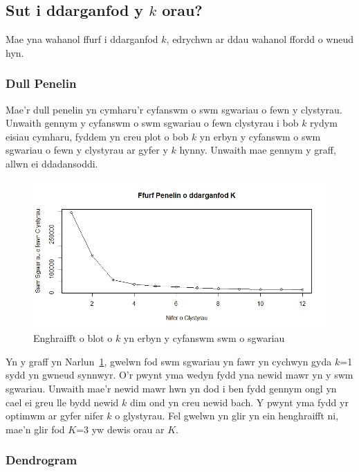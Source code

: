 
\subsection{Sut i ddarganfod y $k$ orau?}

Mae yna wahanol ffurf i ddarganfod $k$, edrychwn ar ddau wahanol ffordd o wneud hyn. 

\subsubsection{Dull Penelin}

Mae'r dull penelin yn cymharu'r cyfanswm o swm sgwariau o fewn y clystyrau. Unwaith gennym y cyfanswm o swm sgwariau o fewn clystyrau i bob $k$ rydym eisiau cymharu, fyddem yn creu plot o bob $k$ yn erbyn y cyfanswm o swm sgwariau o fewn y clystyrau ar gyfer y $k$ hynny. Unwaith mae gennym y graff, allwn ei ddadansoddi. 


\begin{figure}[H]
\begin{center}
\includegraphics[width=0.5\linewidth]{../img/Dull_Penelin.jpeg}
\end{center}
\caption{Enghraifft o blot o $k$ yn erbyn y cyfanswm swm o sgwariau}
\label{fig:dullpenelin}
\end{figure}

Yn y graff yn Narlun~\ref{fig:dullpenelin}, gwelwn fod swm sgwariau yn fawr yn cychwyn gyda $k$=1 sydd yn gwneud synnwyr. %
O'r pwynt yma wedyn fydd yna newid mawr yn y swm sgwariau. Unwaith mae'r newid mawr hwn yn dod i ben fydd gennym ongl yn cael ei greu lle bydd newid $k$ dim ond yn creu newid bach. Y pwynt yma fydd yr optimwm ar gyfer nifer $k$ o glystyrau. Fel gwelwn yn glir yn ein henghraifft ni, mae'n glir fod $K$=3 yw dewis orau ar $K$.

\subsubsection{Dendrogram}

